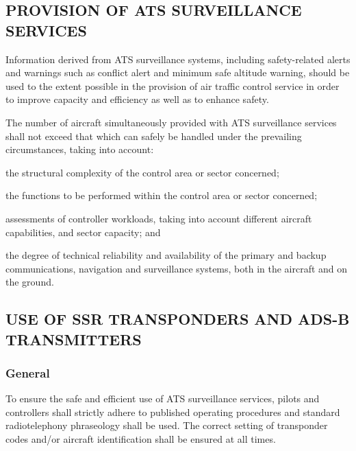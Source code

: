 \subsection[Provision of ATS surveillance services]{PROVISION OF ATS SURVEILLANCE SERVICES}

\begin{enumnoss}
    \item Information derived from ATS surveillance systems, including safety-related alerts and warnings such as conflict alert and minimum safe altitude warning, should be used to the extent possible in the provision of air traffic control service in order to improve capacity and efficiency as well as to enhance safety.
    \item The number of aircraft simultaneously provided with ATS surveillance services shall not exceed that which can safely be handled under the prevailing circumstances, taking into account:

    \begin{enumalph}
        \item the structural complexity of the control area or sector concerned;
        \item the functions to be performed within the control area or sector concerned;
        \item assessments of controller workloads, taking into account different aircraft capabilities, and sector capacity; and
        \item the degree of technical reliability and availability of the primary and backup communications, navigation and surveillance systems, both in the aircraft and on the ground.
    \end{enumalph}
\end{enumnoss}

\subsection[Use of SSR transponders and ADS-B transmitters]{USE OF SSR TRANSPONDERS AND ADS-B TRANSMITTERS}

\subsubsection{General}

To ensure the safe and efficient use of ATS surveillance services, pilots and controllers shall strictly adhere to published operating procedures and standard radiotelephony phraseology shall be used. The correct setting of transponder codes and/or aircraft identification shall be ensured at all times.

